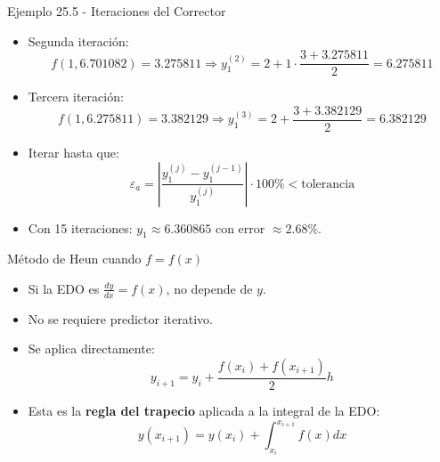 \documentclass[main.tex]{subfiles}
\begin{document}
\begin{frame}{\small Ejemplo 25.5 - Iteraciones del Corrector}
\begin{itemize}
  \item Segunda iteraci\'on:
  \[
    f(1, 6.701082) = 3.275811 \Rightarrow y_1^{(2)} = 2 + 1 \cdot \frac{3 + 3.275811}{2} = 6.275811
  \]
  \item Tercera iteraci\'on:
  \[
    f(1, 6.275811) = 3.382129 \Rightarrow y_1^{(3)} = 2 + \frac{3 + 3.382129}{2} = 6.382129
  \]
  \item Iterar hasta que:
  \[
    \varepsilon_a = \left| \frac{y_1^{(j)} - y_1^{(j-1)}}{y_1^{(j)}} \right| \cdot 100\% < \text{tolerancia}
  \]
  \item Con 15 iteraciones: \( y_1 \approx 6.360865 \) con error \( \approx 2.68\% \).
\end{itemize}
\end{frame}
\begin{frame}{\small Método de Heun cuando \( f = f(x) \)}
\begin{itemize}
  \item Si la EDO es \( \frac{dy}{dx} = f(x) \), no depende de \( y \).
  \item No se requiere predictor iterativo.
  \item Se aplica directamente:
  \[
    y_{i+1} = y_i + \frac{f(x_i) + f(x_{i+1})}{2} h
  \]
  \item Esta es la \textbf{regla del trapecio} aplicada a la integral de la EDO:
  \[
    y(x_{i+1}) = y(x_i) + \int_{x_i}^{x_{i+1}} f(x)dx
  \]
\end{itemize}
\end{frame}
\end{document}
